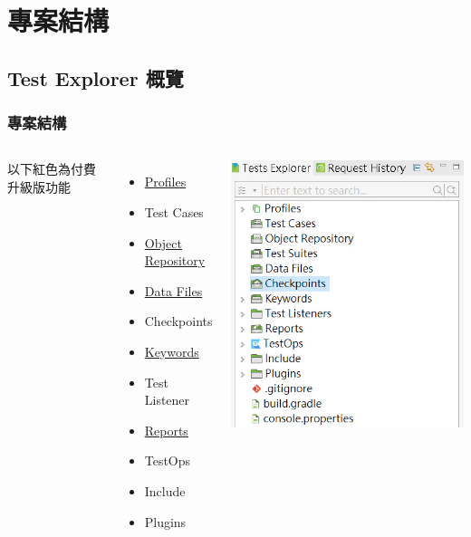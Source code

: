\documentclass{beamer}
\begin{document}

\fi
\section{專案結構}
\subsection{Test Explorer 概覽}
\begin{frame}
    \frametitle{專案結構}
    \begin{columns}
        以下{\color{red}紅色}為付費升級版功能
        \begin{itemize}
            \item \hyperlink{profiles}{Profiles}
            \item Test Cases
            \item \hyperlink{objectRepository}{Object Repository}
            \item \hyperlink{dataFile}{Data Files}
            \item { \color{red} 
                Checkpoints
            }
            \item  \hyperlink{keywords}{Keywords}
            \item Test Listener
            \item { \color{red} 
                \hyperlink{reports}{Reports}
            }
            \item TestOps
            \item Include
            \item Plugins
        \end{itemize}
        \includegraphics[height=0.75\textheight]{picture/專案結構.jpg}
    \end{columns}
\end{frame}	
\label{profiles}
\end{document}
